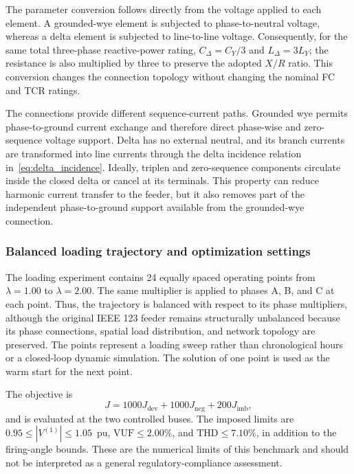 \documentclass[journal]{IEEEtran}
\begin{document}
The parameter conversion follows directly from the voltage applied to each
element. A grounded-wye element is subjected to phase-to-neutral voltage,
whereas a delta element is subjected to line-to-line voltage. Consequently,
for the same total three-phase reactive-power rating,
$C_{\Delta}=C_{Y}/3$ and $L_{\Delta}=3L_{Y}$; the resistance is also multiplied
by three to preserve the adopted $X/R$ ratio. This conversion changes the
connection topology without changing the nominal FC and TCR ratings.

The connections provide different sequence-current paths. Grounded wye permits
phase-to-ground current exchange and therefore direct phase-wise and
zero-sequence voltage support. Delta has no external neutral, and its branch
currents are transformed into line currents through the delta incidence
relation in~\eqref{eq:delta_incidence}. Ideally, triplen and zero-sequence
components circulate inside the closed delta or cancel at its terminals. This
property can reduce harmonic current transfer to the feeder, but it also
removes part of the independent phase-to-ground support available from the
grounded-wye connection.

\subsubsection{Balanced loading trajectory and optimization settings}

The loading experiment contains 24 equally spaced operating points from
$\lambda=1.00$ to $\lambda=2.00$. The same multiplier is applied to phases A,
B, and C at each point. Thus, the trajectory is balanced with respect to its
phase multipliers, although the original IEEE 123 feeder remains structurally
unbalanced because its phase connections, spatial load distribution, and
network topology are preserved. The points represent a loading sweep rather
than chronological hours or a closed-loop dynamic simulation. The solution of
one point is used as the warm start for the next point.

The objective is
\begin{equation}
 J=1000J_{\mathrm{dev}}+1000J_{\mathrm{neg}}+200J_{\mathrm{imb}},
 \label{eq:ieee123_balanced_objective}
\end{equation}
and is evaluated at the two controlled buses. The imposed limits are
$0.95\leq|V^{(1)}|\leq1.05$~pu, $\mathrm{VUF}\leq2.00\%$, and
$\mathrm{THD}\leq7.10\%$, in addition to the firing-angle bounds. These are
the numerical limits of this benchmark and should not be interpreted as a
general regulatory-compliance assessment.
\end{document}
